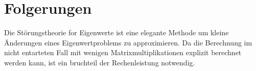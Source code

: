 %
%
%
\section{Folgerungen
\label{ew:section:folgerungen}}

Die Störungstheorie for Eigenwerte ist eine elegante Methode um kleine Änderungen eines Eigenwertproblems zu approximieren.
Da die Berechnung im nicht entarteten Fall mit wenigen Matrixmultiplikationen explizit berechnet werden kann, ist ein bruchteil der Rechenleistung notwendig.


